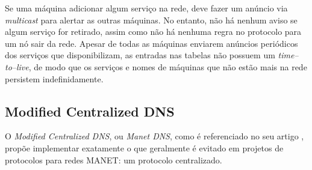     Se uma máquina adicionar algum serviço na rede, deve fazer um anúncio via \textit{multicast} para alertar as outras máquinas. No entanto, não há nenhum aviso se algum serviço for retirado, assim como não há nenhuma regra no protocolo para um nó sair da rede. Apesar de todas as máquinas enviarem anúncios periódicos dos serviços que disponibilizam, as entradas nas tabelas não possuem um \textit{time--to--live}, de modo que os serviços e nomes de máquinas que não estão mais na rede persistem indefinidamente.


\subsection{Modified Centralized DNS}

  O \textit{Modified Centralized DNS}, ou \textit{Manet DNS}, como é referenciado no seu artigo \cite{mcdns}, propõe implementar exatamente o que geralmente é evitado em projetos de protocolos para redes MANET: um protocolo centralizado.